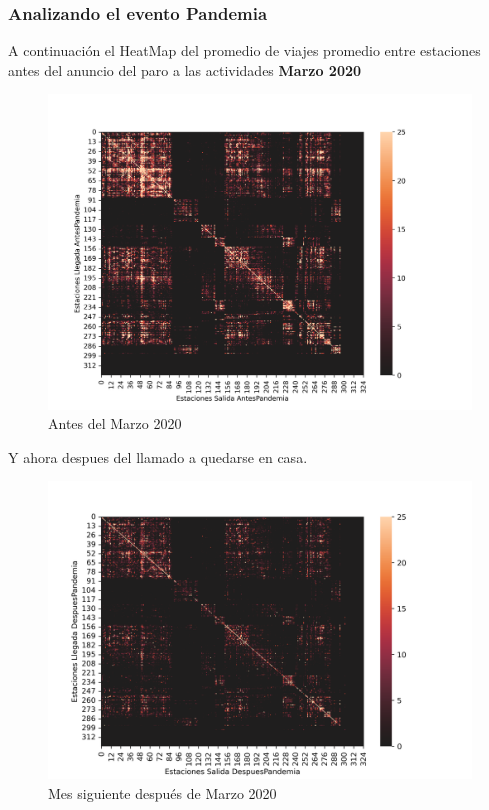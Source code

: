\documentclass[
]{article}
\begin{document}
\newpage
\hypertarget{analizando-el-evento-pandemia}{%
\subsubsection{Analizando el evento
Pandemia}\label{analizando-el-evento-pandemia}}

A continuación el HeatMap del promedio de viajes promedio entre
estaciones antes del anuncio del paro a las actividades \textbf{Marzo
2020}

\begin{figure}
\centering
\includegraphics{../plots/resultsAntesPandemia.png}
\caption{Antes del Marzo 2020}
\end{figure}

Y ahora despues del llamado a quedarse en casa.

\begin{figure}
\centering
\includegraphics{../plots/resultsDespuesPandemia.png}
\caption{Mes siguiente después de Marzo 2020}
\end{figure}
\end{document}
